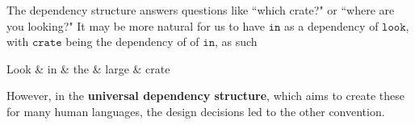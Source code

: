 \documentclass{article}
\begin{document}
      The dependency structure answers questions like ``which crate?" or ``where are you looking?" It may be more natural for us to have $\texttt{in}$ as a dependency of $\texttt{look}$, with $\texttt{crate}$ being the dependency of of $\texttt{in}$, as such 

      \begin{center}
        \begin{dependency}[theme = simple]
        \begin{deptext}[column sep=1em]
        Look \& in \& the \& large \& crate \\
        \end{deptext}
        \end{dependency}
      \end{center}

      However, in the \textbf{universal dependency structure}, which aims to create these for many human languages, the design decisions led to the other convention. 
\end{document}
